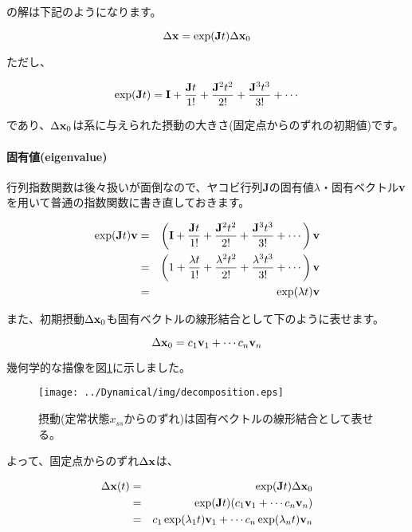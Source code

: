 の解は下記のようになります。

\[\Delta {\bf x}=\exp({\bf J}t)\Delta {\bf x}_0\]

ただし、

\[\exp({\bf J}t) = {\bf I} + \frac{{\bf J}t}{1!} + \frac{{\bf J}^2 t^2}{2!} + \frac{{\bf J}^3 t^3}{3!} + \cdots\]

であり、\(\Delta {\bf x}_0\)は系に与えられた摂動の大きさ(固定点からのずれの初期値)です。

\paragraph{固有値(eigenvalue)}
行列指数関数は後々扱いが面倒なので、ヤコビ行列{\bf J}の固有値\(\lambda\)・固有ベクトル{\bf v}を用いて普通の指数関数に書き直しておきます。

\begin{eqnarray*}
\exp({\bf J}t){\bf v} & = & \left({\bf I} + \frac{{\bf J}t}{1!} + \frac{{\bf J}^2 t^2}{2!} + \frac{{\bf J}^3 t^3}{3!} + \cdots \right){\bf v}\\
                      & = & \left(1 + \frac{\lambda t}{1!} + \frac{\lambda^2 t^2}{2!} + \frac{\lambda^3 t^3}{3!} + \cdots \right){\bf v}\\
                      & = & \exp(\lambda t) {\bf v}\\
\end{eqnarray*}

また、初期摂動\(\Delta {\bf x}_0\)も固有ベクトルの線形結合として下のように表せます。

\[\Delta {\bf x}_0 = c_1 {\bf v}_1 + \cdots c_n {\bf v}_n \]

幾何学的な描像を図\ref{fig:06sysbio}に示しました。

\begin{figure}[ht]
        \centering \texttt{[image: ../Dynamical/img/decomposition.eps]}
        \caption{摂動(定常状態\(x_{ss}\)からのずれ)は固有ベクトルの線形結合として表せる。}
        \label{fig:06sysbio} \end{figure}


よって、固定点からのずれ\(\Delta {\bf x}\)は、

\begin{eqnarray*}
\Delta {\bf x}(t) & = & \exp({\bf J}t)\Delta {\bf x}_0\\
                 & = & \exp({\bf J}t)(c_1 {\bf v}_1 + \cdots c_n {\bf v}_n) \\
                 & = & c_1 \exp(\lambda_1 t){\bf v}_1 + \cdots c_n \exp(\lambda_n t){\bf v}_n \\
\end{eqnarray*}

